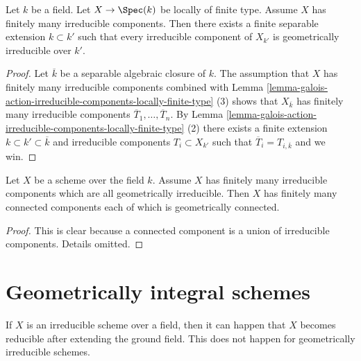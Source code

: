 \begin{lemma}
\label{lemma-finite-extension-geometrically-irreducible-components}
Let $k$ be a field.
Let $X \to \Spec(k)$ be locally of finite type.
Assume $X$ has finitely many irreducible components.
Then there exists a finite separable extension $k \subset k'$
such that every irreducible component of $X_{k'}$
is geometrically irreducible over $k'$.
\end{lemma}

\begin{proof}
Let $\overline{k}$ be a separable algebraic closure of $k$.
The assumption that $X$ has finitely many irreducible components
combined with
Lemma \ref{lemma-galois-action-irreducible-components-locally-finite-type} (3)
shows that $X_{\overline{k}}$ has finitely many irreducible components
$\overline{T}_1, \ldots, \overline{T}_n$. By
Lemma \ref{lemma-galois-action-irreducible-components-locally-finite-type} (2)
there exists a finite extension $k \subset k' \subset \overline{k}$ and
irreducible components $T_i \subset X_{k'}$ such that
$\overline{T}_i = T_{i, \overline{k}}$ and we win.
\end{proof}

\begin{lemma}
\label{lemma-irreducible-components-geometrically-irreducible}
Let $X$ be a scheme over the field $k$.
Assume $X$ has finitely many irreducible components which are
all geometrically irreducible.
Then $X$ has finitely many connected components each of which is
geometrically connected.
\end{lemma}

\begin{proof}
This is clear because a connected component is a union of irreducible
components. Details omitted.
\end{proof}







\section{Geometrically integral schemes}
\label{section-geometrically-integral}

\noindent
If $X$ is an irreducible scheme over a field, then it can happen that $X$
becomes reducible after extending the ground field. This does not happen
for geometrically irreducible schemes.

